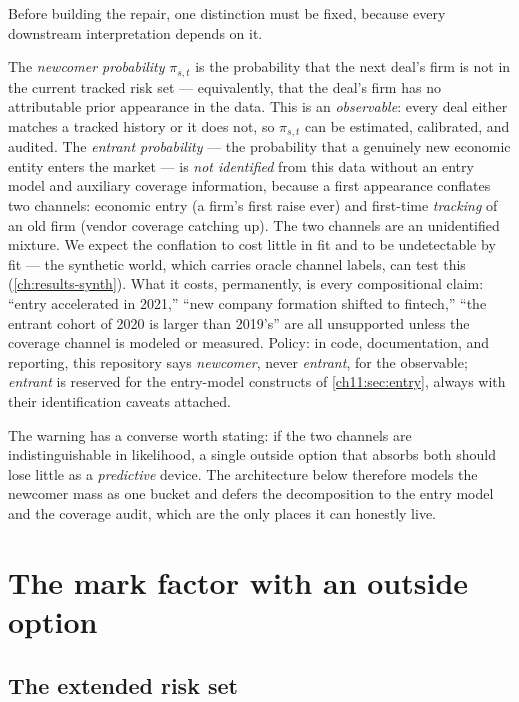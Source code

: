 Before building the repair, one distinction must be fixed, because
every downstream interpretation depends on it.

\begin{warning}\label{warn:ch11:entrant}
The \emph{newcomer probability} $\pi_{s,t}$ is the probability that the
next deal's firm is not in the current tracked risk set --- equivalently,
that the deal's firm has no attributable prior appearance in the data.
This is an \emph{observable}: every deal either matches a tracked history
or it does not, so $\pi_{s,t}$ can be estimated, calibrated, and audited.
The \emph{entrant probability} --- the probability that a genuinely new
economic entity enters the market --- is \emph{not identified} from this
data without an entry model and auxiliary coverage information, because a
first appearance conflates two channels: economic entry (a firm's first
raise ever) and first-time \emph{tracking} of an old firm (vendor
coverage catching up). The two channels are an unidentified mixture. We
expect the conflation to cost little in fit and to be undetectable by
fit --- the synthetic world, which carries oracle channel labels, can
test this (\cref{ch:results-synth}). What it costs, permanently,
is every compositional claim: ``entry accelerated in 2021,'' ``new
company formation shifted to fintech,'' ``the entrant cohort of 2020 is
larger than 2019's'' are all unsupported unless the coverage channel is
modeled or measured. Policy: in code, documentation, and reporting, this
repository says \emph{newcomer}, never \emph{entrant}, for the observable;
\emph{entrant} is reserved for the entry-model constructs of
\cref{ch11:sec:entry}, always with their identification caveats attached.
\end{warning}

The warning has a converse worth stating: if the two channels are
indistinguishable in likelihood, a single outside option that absorbs
both should lose little as a \emph{predictive} device. The
architecture below therefore models the newcomer mass as one bucket and
defers the decomposition to the entry model and the coverage audit, which
are the only places it can honestly live.

\section{The mark factor with an outside option}\label{ch11:sec:outside}

\subsection{The extended risk set}\label{ch11:sec:extended}

